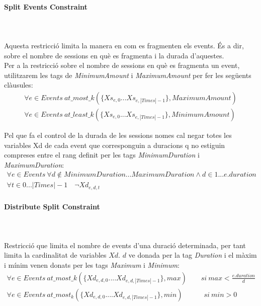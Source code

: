 \documentclass[11pt,a4paper,twoside]{report}
\begin{document}
  \paragraph*{Split Events Constraint} ~\\~\\ 
  Aquesta restricció limita la manera en com es fragmenten els events. És a dir, sobre el nombre de sessions en què es fragmenta i la durada d'aquestes.\\
  Per a la restricció sobre el nombre de sessions en què es fragmenta un event, utilitzarem les tags de \textit{MinimumAmount} i \textit{MaximumAmount} per fer les següents clàusules:
  \begin{gather*}
    \forall e \in Events \ at\_most\_k(\{Xs_{e,0} . . . Xs_{e,|Times|-1}\}, MaximumAmount)\\
    \forall e \in Events \ at\_least\_k(\{Xs_{e,0} . . . Xs_{e,|Times|-1}\}, MinimumAmount)
  \end{gather*}

  Pel que fa el control de la durada de les sessions nomes cal negar totes les variables Xd de cada event que corresponguin a duracions q no estiguin compreses entre el rang definit per les tags \textit{MinimumDuration} i \textit{MaximumDuration}:
  \begin{gather*}
    \forall e \in Events \ \forall d \notin MinimumDuration...MaximumDuration \land d \in 1 ... e.duration  \\
    \forall t \in 0...|Times|-1 \quad \neg Xd_{e,d,t}
  \end{gather*}

  \paragraph*{Distribute Split Constraint} ~\\~\\

  Restricció que limita el nombre de events d'una duració determinada, per tant limita la cardinalitat de variables $Xd$. $d$ ve donada per la tag \textit{Duration} i el màxim i mínim venen donats per les tags \textit{Maximum} i \textit{Minimum}:
  \begin{gather*}
  \forall e \in Events \ at\_most\_k(\{Xd_{e,d,0} .... Xd_{e,d,|Times|-1}\}, max) \quad \quad si \ max<\frac{e.duration}{d}\\
  \forall e \in Events \ at\_most_k(\{Xd_{e,d,0} .... Xd_{e,d,|Times|-1}\}, min) \quad \quad \quad si \ min>0\\
  \end{gather*}
\end{document}
